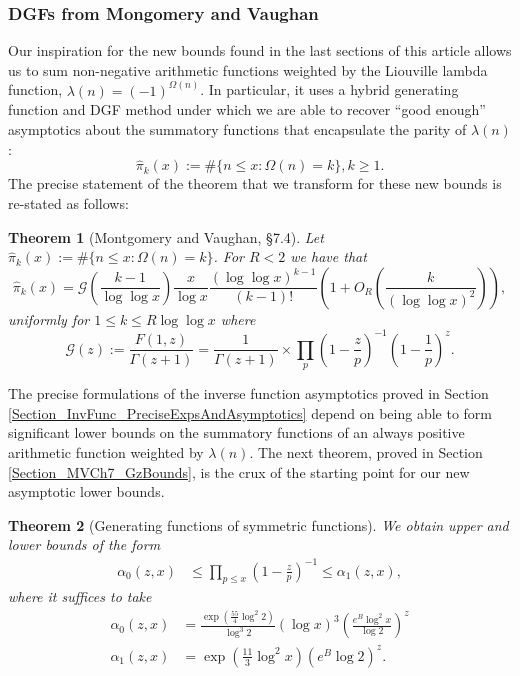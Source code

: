 \documentclass[11pt,reqno,a4letter]{article}
\numberwithin{figure}{section}
\numberwithin{table}{section}
\theoremstyle{plain}
\newtheorem{theorem}{Theorem}
\numberwithin{theorem}{section}
\theoremstyle{definition}
\begin{document}
\subsubsection{DGFs from Mongomery and Vaughan} 

Our inspiration for the new bounds found in the last sections of this article allows us to sum 
non-negative arithmetic functions weighted by the Liouville lambda function, 
$\lambda(n) = (-1)^{\Omega(n)}$. In particular, it uses a hybrid generating function and DGF method 
under which we are able to recover ``good enough'' asymptotics about the summatory functions that 
encapsulate the parity of $\lambda(n)$: 
\[
\widehat{\pi}_k(x) := \#\{n \leq x: \Omega(n) = k\}, k \geq 1. 
\] 
The precise statement of the theorem that we transform for these new bounds is re-stated as follows: 

\begin{theorem}[Montgomery and Vaughan, \S 7.4]
\label{theorem_HatPi_ExtInTermsOfGz} 
Let $\widehat{\pi}_k(x) := \#\{n \leq x: \Omega(n)=k\}$. For $R < 2$ we have that 
\[
\widehat{\pi}_k(x) = \mathcal{G}\left(\frac{k-1}{\log\log x}\right) \frac{x}{\log x} 
     \frac{(\log\log x)^{k-1}}{(k-1)!} \left(1 + O_R\left(\frac{k}{(\log\log x)^2}\right)\right),  
\]
uniformly for $1 \leq k \leq R \log\log x$ where 
\[
\mathcal{G}(z) := \frac{F(1, z)}{\Gamma(z+1)} = \frac{1}{\Gamma(z+1)} \times 
     \prod_p \left(1-\frac{z}{p}\right)^{-1} \left(1-\frac{1}{p}\right)^z. 
\]
\end{theorem} 

The precise formulations of the inverse function asymptotics 
proved in Section \ref{Section_InvFunc_PreciseExpsAndAsymptotics} depend on being able to form 
significant lower bounds on the summatory functions of an always positive arithmetic function 
weighted by $\lambda(n)$. 
The next theorem, proved in Section \ref{Section_MVCh7_GzBounds}, 
is the crux of the starting point for our new asymptotic lower bounds. 

\begin{theorem}[Generating functions of symmetric functions] 
\label{theorem_GFs_SymmFuncs_SumsOfRecipOfPowsOfPrimes} 
We obtain upper and lower bounds of the form
\begin{align*} 
\alpha_0(z, x) & \leq \prod_{p \leq x} \left(1-\frac{z}{p}\right)^{-1} \leq \alpha_1(z, x), 
\end{align*} 
where it suffices to take 
\begin{align*}
\alpha_0(z, x) & = \frac{\exp\left(\frac{55}{4} \log^2 2\right)}{\log^3 2} (\log x)^3 
     \left(\frac{e^{B} \log^2 x}{\log 2}\right)^{z} \\ 
\alpha_1(z, x) & = \exp\left(\frac{11}{3} \log^2 x\right) \left(e^{B} \log 2\right)^{z}. 
\end{align*}  
\end{theorem} 
\end{document}

